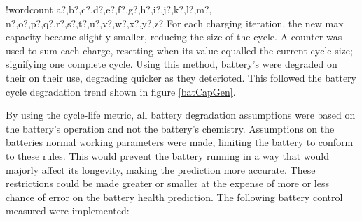 \documentclass[fontsize=9.5pt]{extarticle}
\numberwithin{figure}{section} %
\newcounter{words}
\newenvironment{counted}{%
  \setcounter{words}{0}
  \SearchList!{wordcount}{\stepcounter{words}}
    {a?,b?,c?,d?,e?,f?,g?,h?,i?,j?,k?,l?,m?,
    n?,o?,p?,q?,r?,s?,t?,u?,v?,w?,x?,y?,z?}
  \UndoBoundary{'}
  \SearchOrder{p;}}{%
  \StopSearching}
\begin{document}
\begin{counted}
For each charging iteration, the new max capacity became slightly
smaller, reducing the size of the cycle. A counter was used to sum each
charge, resetting when its value equalled the current cycle size;
signifying one complete cycle. Using this method, battery's were
degraded on their on their use, degrading quicker as they deterioted.
This followed the battery cycle degradation trend shown in figure
\ref{batCapGen}.

By using the cycle-life metric, all battery degradation assumptions were
based on the battery's operation and not the battery's chemistry.
Assumptions on the batteries normal working parameters were made,
limiting the battery to conform to these rules. This would prevent the
battery running in a way that would majorly affect its longevity, making
the prediction more accurate. These restrictions could be made greater
or smaller at the expense of more or less chance of error on the battery
health prediction. The following battery control measured were
implemented:


\end{counted}
\end{document}
